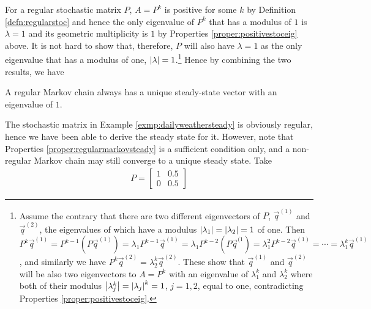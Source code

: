 For a regular stochastic matrix $P$, $A = P^k$ is positive for some $k$ by Definition \ref{defn:regularstoc} and hence the only eigenvalue of $P^k$ that has a modulus of $1$ is $\lambda = 1$ and its geometric multiplicity is $1$ by Properties \ref{proper:positivestoceig} above. It is not hard to show that, therefore, $P$ will also have $\lambda = 1$ as the only eigenvalue that has a modulus of one, $\abs{\lambda} = 1$.\footnote{Assume the contrary that there are two different eigenvectors of $P$, $\vec{q}^{(1)}$ and $\vec{q}^{(2)}$, the eigenvalues of which have a modulus $\abs{\lambda_1} = \abs{\lambda_2} = 1$ of one. Then $P^k\vec{q}^{(1)} = P^{k-1}(P\vec{q}^{(1)}) = \lambda_1 P^{k-1}\vec{q}^{(1)} = \lambda_1 P^{k-2} (P\vec{q}^{(1}) = \lambda_1^2 P^{k-2}\vec{q}^{(1)} = \cdots = \lambda_1^k \vec{q}^{(1)}$, and similarly we have $P^k\vec{q}^{(2)} = \lambda_2^k \vec{q}^{(2)}$. These show that $\vec{q}^{(1)}$ and $\vec{q}^{(2)}$ will be also two eigenvectors to $A = P^k$ with an eigenvalue of $\lambda_1^k$ and $\lambda_2^k$ where both of their modulus $\abs{\lambda_j^k} = \abs{\lambda_j}^k = 1$, $j = 1,2$, equal to one, contradicting Properties \ref{proper:positivestoceig}.} Hence by combining the two results, we have
\begin{proper}
\label{proper:regularmarkovsteady}
A regular Markov chain always has a unique steady-state vector with an eigenvalue of $1$.  
\end{proper}
The stochastic matrix in Example \ref{exmp:dailyweathersteady} is obviously regular, hence we have been able to derive the steady state for it. However, note that Properties \ref{proper:regularmarkovsteady} is a sufficient condition only, and a non-regular Markov chain may still converge to a unique steady state. Take
\begin{align*}
P = 
\begin{bmatrix}
1 & 0.5 \\
0 & 0.5
\end{bmatrix}
\end{align*}
